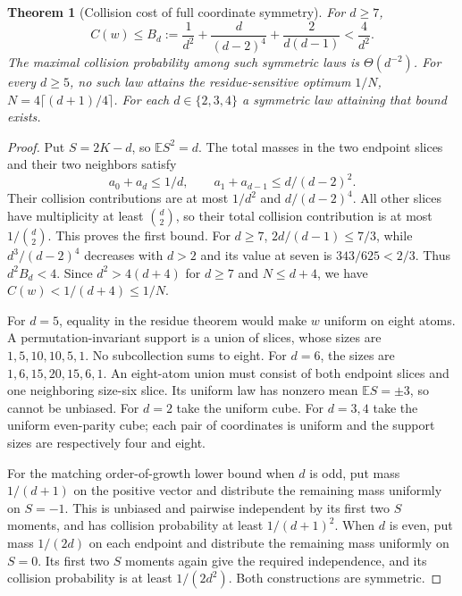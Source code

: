 \documentclass[11pt]{article}
\newtheorem{theorem}{Theorem}[section]
\begin{document}
\begin{theorem}[Collision cost of full coordinate symmetry]
\label{thm:symmetry-collision}
For $d\ge7$,
\[
 C(w)\le B_d:=\frac1{d^2}+\frac d{(d-2)^4}
                    +\frac2{d(d-1)}<\frac4{d^2}.
\]
The maximal collision probability among such symmetric laws is
$\Theta(d^{-2})$. For every $d\ge5$, no such law attains the
residue-sensitive optimum
$1/N$, $N=4\lceil(d+1)/4\rceil$.
For each $d\in\{2,3,4\}$ a symmetric law attaining that bound exists.
\end{theorem}
\begin{proof}
Put $S=2K-d$, so $\mathbb E S^2=d$. The total masses in the two
endpoint slices and their two neighbors satisfy
\[
 a_0+a_d\le1/d,\qquad a_1+a_{d-1}\le d/(d-2)^2.
\]
Their collision contributions are at most $1/d^2$ and
$d/(d-2)^4$. All other slices have multiplicity at least
$\binom d2$, so their total collision contribution is at most
$1/\binom d2$. This proves the first bound. For $d\ge7$,
$2d/(d-1)\le7/3$, while $d^3/(d-2)^4$ decreases with $d>2$
and its value at seven is $343/625<2/3$. Thus $d^2B_d<4$.
Since $d^2>4(d+4)$ for $d\ge7$ and $N\le d+4$, we have
$C(w)<1/(d+4)\le1/N$.

For $d=5$, equality in the residue theorem would make $w$ uniform
on eight atoms. A permutation-invariant support is a union of slices,
whose sizes are $1,5,10,10,5,1$. No subcollection sums to eight.
For $d=6$, the sizes are $1,6,15,20,15,6,1$. An eight-atom union must
consist of both endpoint slices and one neighboring size-six slice.
Its uniform law has nonzero mean $\mathbb E S=\pm3$, so cannot be
unbiased. For $d=2$ take the uniform cube. For $d=3,4$ take the uniform
even-parity cube; each pair of coordinates is uniform and the support
sizes are respectively four and eight.

For the matching order-of-growth lower bound when $d$ is odd, put
mass $1/(d+1)$ on the positive vector and distribute the remaining
mass uniformly on $S=-1$. This is unbiased and pairwise independent
by its first two $S$ moments, and has collision probability at least
$1/(d+1)^2$. When $d$ is even, put mass $1/(2d)$ on each endpoint
and distribute the remaining mass uniformly on $S=0$. Its first two
$S$ moments again give the required independence, and its collision
probability is at least $1/(2d^2)$. Both constructions are symmetric.
\end{proof}
\end{document}
